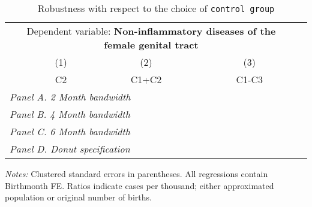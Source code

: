  \begin{table}[H] \begin{threeparttable} \centering \caption{Robustness with respect to the choice of \texttt{control group}} {\def\sym#1{\ifmmode^{#1}\else\(^{#1}\)\fi} \begin{tabular}{l*{4}{c}} \toprule \multicolumn{4}{c}{Dependent variable: \textbf{Non-inflammatory diseases of the female genital tract}} \\ \cmidrule(lr){2-4}
            &\multicolumn{1}{c}{(1)}&\multicolumn{1}{c}{(2)}&\multicolumn{1}{c}{(3)}\\
            &\multicolumn{1}{c}{C2}&\multicolumn{1}{c}{C1+C2}&\multicolumn{1}{c}{C1-C3}\\
\midrule
 \multicolumn{4}{l}{\emph{Panel A. 2 Month bandwidth}} \\    \midrule\multicolumn{4}{l}{\emph{Panel B. 4 Month bandwidth}} \\    \midrule\multicolumn{4}{l}{\emph{Panel C. 6 Month bandwidth}} \\    \midrule\multicolumn{4}{l}{\emph{Panel D. Donut specification}} \\    
\bottomrule \end{tabular} } \begin{tablenotes} \item \scriptsize \emph{Notes:} Clustered standard errors in parentheses. All regressions contain Birthmonth FE. Ratios indicate cases per thousand; either approximated population or original number of births. \end{tablenotes} \end{threeparttable} \end{table} 

